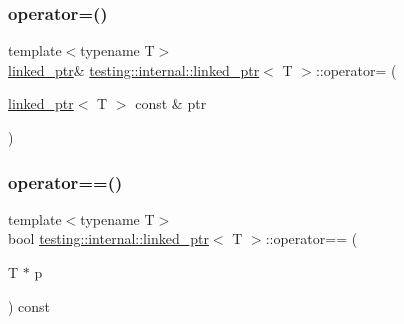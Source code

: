 \subsubsection{\texorpdfstring{operator=()}{operator=()}\hspace{0.1cm}{\footnotesize\ttfamily [2/2]}}
{\footnotesize\ttfamily template$<$typename T$>$ \\
\mbox{\hyperlink{classtesting_1_1internal_1_1linked__ptr}{linked\+\_\+ptr}}\& \mbox{\hyperlink{classtesting_1_1internal_1_1linked__ptr}{testing\+::internal\+::linked\+\_\+ptr}}$<$ T $>$\+::operator= (\begin{DoxyParamCaption}\item[{\mbox{\hyperlink{classtesting_1_1internal_1_1linked__ptr}{linked\+\_\+ptr}}$<$ T $>$ const \&}]{ptr }\end{DoxyParamCaption})\hspace{0.3cm}{\ttfamily [inline]}}

\mbox{\label{classtesting_1_1internal_1_1linked__ptr_ad87ac8ff5543b6fad66e2f3c9844581a}} 
\subsubsection{\texorpdfstring{operator==()}{operator==()}\hspace{0.1cm}{\footnotesize\ttfamily [1/2]}}
{\footnotesize\ttfamily template$<$typename T$>$ \\
bool \mbox{\hyperlink{classtesting_1_1internal_1_1linked__ptr}{testing\+::internal\+::linked\+\_\+ptr}}$<$ T $>$\+::operator== (\begin{DoxyParamCaption}\item[{T $\ast$}]{p }\end{DoxyParamCaption}) const\hspace{0.3cm}{\ttfamily [inline]}}

\mbox{\label{classtesting_1_1internal_1_1linked__ptr_a79306e959a4ae7b3a9da641d2ba06ce6}} 
